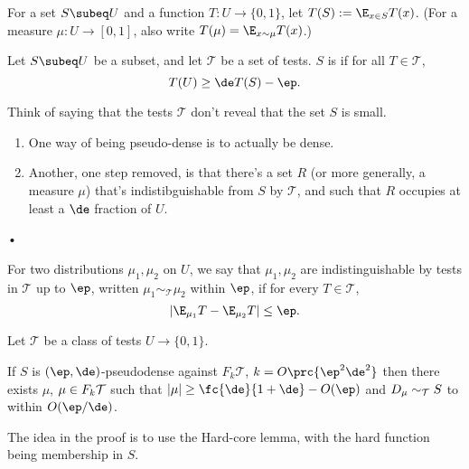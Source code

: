 \begin{df}
For a set $S\subeq U$ and a function $T:U \to \{0,1\}$,  let $T(S):=\E_{x\in S} T(x)$. (For a measure $\mu: U\to [0,1]$, also write $T(\mu) = \E_{x\sim \mu} T(x)$.)

Let $S\subeq U$ be a subset, and let $\mathcal T$ be a set of tests. $S$ is  if for all $T\in \mathcal T$, 
$$
T(U) \ge \de T(S)-\ep.
$$
\end{df}
Think of saying that the tests $\mathcal T$ don't reveal that the set $S$ is small. 
\begin{enumerate}
\item
One way of being pseudo-dense is to actually be dense.
\item
Another, one step removed, is that there's a set $R$ (or more generally, a measure $\mu$) that's
indistibguishable from $S$ by $\mathcal T$, and such that $R$ occupies at least a $\de$ fraction of $U$.
\end{enumerate}•
\begin{df}
For two distributions $\mu_1,\mu_2$ on $U$, we say that $\mu_1,\mu_2$ are indistinguishable by tests in  $\mathcal T$ up to $\ep$, written $\mu_1 \sim_{\mathcal T} \mu_2$ within $\ep$, if for every $T\in \mathcal T$, 
$$
|\E_{\mu_1}T - \E_{\mu_2} T| \le \ep.
$$
\end{df}
\begin{thm}\label{thm:dmt}
Let $\mathcal T$ be a class of tests $U\to \{0,1\}$. 

If $S$ is $(\ep,\de)$-pseudodense against $F_k\mathcal T$, $k=O\prc{\ep^2\de^2}$ then there exists $\mu$, $\mu\in F_k\cal T$ such that $|\mu|\ge \fc{\de}{1+\de}-O(\ep)$ and $D_\mu\sim_{\cal T} S$ to within $O(\ep/\de)$. 
\end{thm}
The idea in the proof is to use the Hard-core lemma, with the hard function being membership in $S$.
